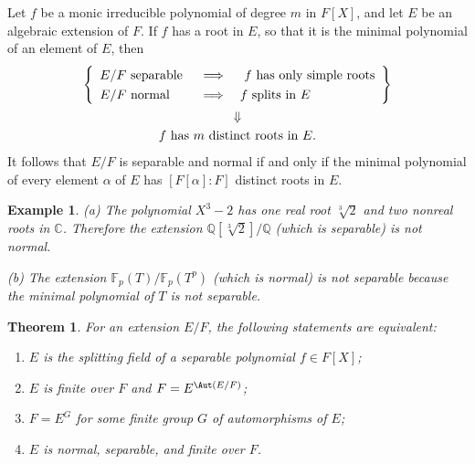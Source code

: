 \documentclass[a4paper,11pt,final,openany]{memoir}
\newtheorem{theorem}[X]{Theorem}
\newtheorem{example}[X]{Example}
\theoremstyle{nonumberplain}
\begin{document}
Let $f$ be a monic irreducible polynomial of degree $m$ in $F[X]$, and let $E$
be an algebraic extension of $F$. If $f$ has a root in $E$, so that it is the
minimal polynomial of an element of $E$, then
\begin{gather*}
\renewcommand{\arraystretch}{1.3}\left\{
\begin{array}
[c]{lcl}%
E/F\text{\ separable } & \implies & \text{\ }f\text{\ has only simple roots}\\
E/F\text{\ normal } & \implies & f\text{\ splits in }E
\end{array}
\right\}  \\
\Downarrow \\
f\text{\ has }m\text{\ distinct roots in }E.
\end{gather*}
It follows that $E/F$ is separable and normal if and only if the minimal
polynomial of every element $\alpha$ of $E$ has $[F[\alpha]\colon F]$ distinct
roots in $E$.

\begin{example}
\label{ft11}(a) The polynomial $X^{3}-2{}$ has one real root $\sqrt[3]{2}$ and
two nonreal roots in $\mathbb{C}{}$. Therefore the extension $\mathbb{Q}%
[\sqrt[3]{2}]/\mathbb{Q}{}$ (which is separable) is not normal.

(b) The extension $\mathbb{F}_{p}(T)/\mathbb{F}_{p}(T^{p})$ (which is normal)
is not separable because the minimal polynomial of $T$ is not separable.
\end{example}

\begin{theorem}
\label{ft12}%
%
For an extension $E/F$, the following statements are equivalent:

\begin{enumerate}
\item $E$ is the splitting field of a separable polynomial $f\in F[X]$;

\item $E$ is finite over $F$ and $F=E^{\Aut(E/F)}$;

\item $F=E^{G}$ for some finite group $G$ of automorphisms of $E$;

\item $E$ is normal, separable, and finite over $F$.
\end{enumerate}
\end{theorem}
\end{document}
